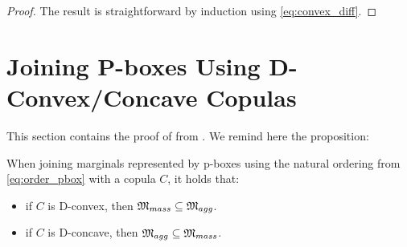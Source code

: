 \begin{proof}
    The result is straightforward by induction using \cref{eq:convex_diff}.
\end{proof}

\section{Joining P-boxes Using D-Convex/Concave Copulas}\label{sec:annex_dconvex_pbox}
This section contains the proof of  from . We remind here the proposition:
\begin{proposition}
    When joining marginals represented by p-boxes using the natural ordering from \eqref{eq:order_pbox} with a copula $C$, it holds that:
    \begin{itemize}
        \item if $C$ is D-convex, then $\mathfrak{M}_{mass}\subseteq \mathfrak{M}_{agg}$.
        \item if $C$ is D-concave, then $\mathfrak{M}_{agg}\subseteq\mathfrak{M}_{mass}$.
    \end{itemize}
\end{proposition}

